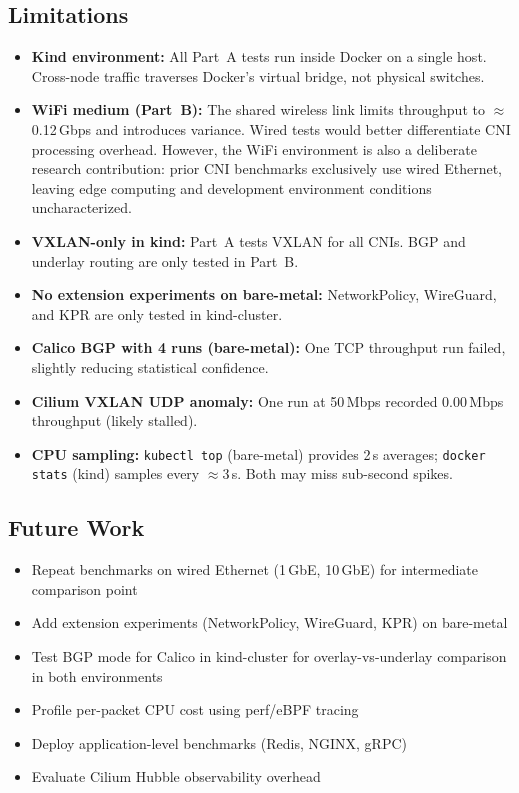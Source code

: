 \documentclass[11pt,a4paper]{article}
\begin{document}
\subsection{Limitations}

\begin{itemize}
  \item \textbf{Kind environment:} All Part~A tests run inside Docker on a single host. Cross-node traffic traverses Docker's virtual bridge, not physical switches.
  \item \textbf{WiFi medium (Part~B):} The shared wireless link limits throughput to $\approx$0.12\,Gbps and introduces variance. Wired tests would better differentiate CNI processing overhead. However, the WiFi environment is also a deliberate research contribution: prior CNI benchmarks exclusively use wired Ethernet, leaving edge computing and development environment conditions uncharacterized.
  \item \textbf{VXLAN-only in kind:} Part~A tests VXLAN for all CNIs. BGP and underlay routing are only tested in Part~B.
  \item \textbf{No extension experiments on bare-metal:} NetworkPolicy, WireGuard, and KPR are only tested in kind-cluster.
  \item \textbf{Calico BGP with 4 runs (bare-metal):} One TCP throughput run failed, slightly reducing statistical confidence.
  \item \textbf{Cilium VXLAN UDP anomaly:} One run at 50\,Mbps recorded 0.00\,Mbps throughput (likely stalled).
  \item \textbf{CPU sampling:} \texttt{kubectl top} (bare-metal) provides 2\,s averages; \texttt{docker stats} (kind) samples every $\approx$3\,s. Both may miss sub-second spikes.
\end{itemize}

\subsection{Future Work}

\begin{itemize}
  \item Repeat benchmarks on wired Ethernet (1\,GbE, 10\,GbE) for intermediate comparison point
  \item Add extension experiments (NetworkPolicy, WireGuard, KPR) on bare-metal
  \item Test BGP mode for Calico in kind-cluster for overlay-vs-underlay comparison in both environments
  \item Profile per-packet CPU cost using perf/eBPF tracing
  \item Deploy application-level benchmarks (Redis, NGINX, gRPC)
  \item Evaluate Cilium Hubble observability overhead
\end{itemize}
\end{document}
